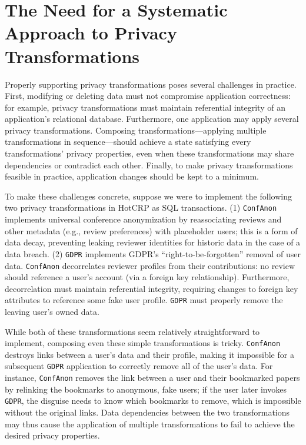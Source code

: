 \section{The Need for a Systematic Approach to Privacy Transformations}
Properly supporting privacy transformations poses several challenges in practice. First, modifying or
deleting data must not compromise application correctness: for example, privacy transformations must
maintain referential integrity of an application's relational database.
%
Furthermore, one application may apply several privacy transformations. Composing
transformations---applying multiple transformations in sequence---should achieve a state satisfying
every transformations' privacy properties, even when these transformations may share dependencies or
contradict each other.
%
Finally, to make privacy transformations feasible in practice, application changes should be kept to
a minimum.
%

%
To make these challenges concrete, suppose we were to implement the following two privacy
transformations in HotCRP as SQL transactions. (1) \texttt{ConfAnon} implements universal conference
anonymization by reassociating reviews and other metadata (e.g., review preferences) with
placeholder users; this is a form of data decay, preventing leaking reviewer identities for historic data in
the case of a data breach. (2) \texttt{GDPR} implements GDPR's ``right-to-be-forgotten'' removal of user data.
%
\texttt{ConfAnon} decorrelates reviewer profiles from their contributions: no review should reference a
user's account (via a foreign key relationship).
Furthermore, decorrelation must maintain referential integrity, requiring changes to foreign key
attributes to reference some fake user profile.
\texttt{GDPR} must properly remove the leaving user's owned data.

While both of these transformations seem relatively straightforward to implement, composing even
these simple transformations is tricky. \texttt{ConfAnon} destroys links between a user's data and
their profile, making it impossible for a subsequent \texttt{GDPR} application to correctly remove
all of the user's data. 
%
For instance, \texttt{ConfAnon} removes the link between a user and their bookmarked papers by
relinking the bookmarks to anonymous, fake users; if the user later invokes \texttt{GDPR}, the
disguise needs to know which bookmarks to remove, which is impossible without the 
original links.
%
Data dependencies between the two transformations may thus cause the application of multiple
transformations to fail to achieve the desired privacy properties.
%

